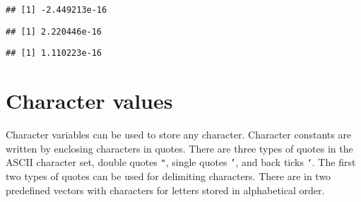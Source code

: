 \documentclass[paper=a4,headsepline,BCOR=12mm,twoside,open=right,%
titlepage,headings=small,fontsize=10pt,index=totoc,bibliography=totoc,%
captions=tableheading,captions=nooneline]{scrbook}\usepackage{knitr}
\begin{document}
\begin{knitrout}
\begin{kframe}
\begin{verbatim}
## [1] -2.449213e-16
\end{verbatim}
\begin{alltt}
\hlopt{$} 
\end{alltt}
\begin{verbatim}
## [1] 2.220446e-16
\end{verbatim}
\begin{alltt}
\hlopt{$}
\end{alltt}
\begin{verbatim}
## [1] 1.110223e-16
\end{verbatim}
\end{kframe}
\end{knitrout}

\section{Character values}

Character variables can be used to store any character. Character constants are written by enclosing characters in quotes. There are three types of quotes in the ASCII character set, double quotes \texttt{"}, single quotes \texttt{'}, and back ticks \texttt{`}. The first two types of quotes can be used for delimiting characters. There are in \R two predefined vectors with characters for letters stored in alphabetical order.
\end{document}
